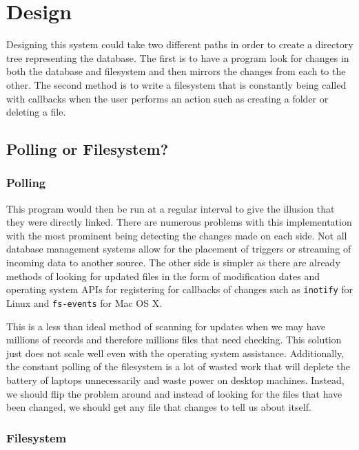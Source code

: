 \chapter{Design}

Designing this system could take two different paths in order to create a directory tree representing the database. The first is to have a program look for changes in both the database and filesystem and then mirrors the changes from each to the other. The second method is to write a filesystem that is constantly being called with callbacks when the user performs an action such as creating a folder or deleting a file.

\section{Polling or Filesystem?}

\subsection{Polling}

This program would then be run at a regular interval to give the illusion that they were directly linked. There are numerous problems with this implementation with the most prominent being detecting the changes made on each side. Not all database management systems allow for the placement of triggers or streaming of incoming data to another source. The other side is simpler as there are already methods of looking for updated files in the form of modification dates and operating system APIs for registering for callbacks of changes such as \texttt{inotify} for Linux and \texttt{fs-events} for Mac OS X.

This is a less than ideal method of scanning for updates when we may have millions of records and therefore millions files that need checking. This solution just does not scale well even with the operating system assistance. Additionally, the constant polling of the filesystem is a lot of wasted work that will deplete the battery of laptops unnecessarily and waste power on desktop machines. Instead, we should flip the problem around and instead of looking for the files that have been changed, we should get any file that changes to tell us about itself.

\subsection{Filesystem}

